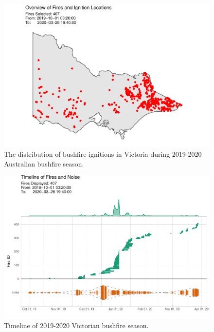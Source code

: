 \begin{Schunk}
\begin{figure}

{\centering \includegraphics[width=0.8\linewidth]{clustering_paper_files/figure-latex/clusteringfinalresults-1} 

}

\caption[ The distribution of bushfire ignitions in Victoria during 2019-2020 Australian bushfire season]{ The distribution of bushfire ignitions in Victoria during 2019-2020 Australian bushfire season.}\label{fig:clusteringfinalresults}
\end{figure}
\end{Schunk}

\begin{Schunk}
\begin{figure}

{\centering \includegraphics[width=0.8\linewidth]{clustering_paper_files/figure-latex/himtimeline-1} 

}

\caption[Timeline of 2019-2020 Victorian bushfire season]{Timeline of 2019-2020 Victorian bushfire season.}\label{fig:himtimeline}
\end{figure}
\end{Schunk}

